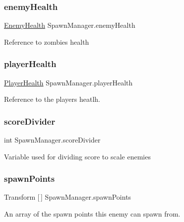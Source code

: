 \subsubsection{\texorpdfstring{enemyHealth}{enemyHealth}}
{\footnotesize\ttfamily \mbox{\hyperlink{class_enemy_health}{Enemy\+Health}} Spawn\+Manager.\+enemy\+Health\hspace{0.3cm}{\ttfamily [private]}}

Reference to zombie\textquotesingle{}s health \mbox{\label{class_spawn_manager_ae1236e4e0a8291456b46cebfbd799324}} 
\subsubsection{\texorpdfstring{playerHealth}{playerHealth}}
{\footnotesize\ttfamily \mbox{\hyperlink{class_player_health}{Player\+Health}} Spawn\+Manager.\+player\+Health}

Reference to the player\textquotesingle{}s heatlh. \mbox{\label{class_spawn_manager_afeb5277ecfc19f64c5cbe1e88054d448}} 
\subsubsection{\texorpdfstring{scoreDivider}{scoreDivider}}
{\footnotesize\ttfamily int Spawn\+Manager.\+score\+Divider\hspace{0.3cm}{\ttfamily [private]}}

Variable used for dividing score to scale enemies \mbox{\label{class_spawn_manager_aaa2bc047315ee2c588161b09f06aaa3c}} 
\subsubsection{\texorpdfstring{spawnPoints}{spawnPoints}}
{\footnotesize\ttfamily Transform \mbox{[}$\,$\mbox{]} Spawn\+Manager.\+spawn\+Points}

An array of the spawn points this enemy can spawn from. \mbox{\label{class_spawn_manager_acb6b516157bae17819218c7e2436e5b7}} 
